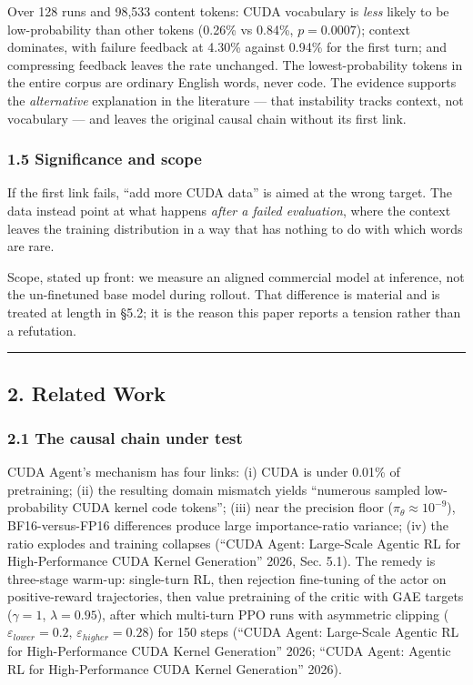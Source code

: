\documentclass[
  11pt,
]{article}
\begin{document}
Over 128 runs and 98,533 content tokens: CUDA vocabulary is \emph{less}
likely to be low-probability than other tokens (0.26\% vs 0.84\%,
\(p = 0.0007\)); context dominates, with failure feedback at 4.30\%
against 0.94\% for the first turn; and compressing feedback leaves the
rate unchanged. The lowest-probability tokens in the entire corpus are
ordinary English words, never code. The evidence supports the
\emph{alternative} explanation in the literature --- that instability
tracks context, not vocabulary --- and leaves the original causal chain
without its first link.

\hypertarget{significance-and-scope}{%
\subsubsection{1.5 Significance and
scope}\label{significance-and-scope}}

If the first link fails, ``add more CUDA data'' is aimed at the wrong
target. The data instead point at what happens \emph{after a failed
evaluation}, where the context leaves the training distribution in a way
that has nothing to do with which words are rare.

Scope, stated up front: we measure an aligned commercial model at
inference, not the un-finetuned base model during rollout. That
difference is material and is treated at length in §5.2; it is the
reason this paper reports a tension rather than a refutation.

\begin{center}\rule{0.5\linewidth}{0.5pt}\end{center}

\hypertarget{related-work}{%
\subsection{2. Related Work}\label{related-work}}

\hypertarget{the-causal-chain-under-test}{%
\subsubsection{2.1 The causal chain under
test}\label{the-causal-chain-under-test}}

CUDA Agent's mechanism has four links: (i) CUDA is under 0.01\% of
pretraining; (ii) the resulting domain mismatch yields ``numerous
sampled low-probability CUDA kernel code tokens''; (iii) near the
precision floor (\(\pi_\theta \approx 10^{-9}\)), BF16-versus-FP16
differences produce large importance-ratio variance; (iv) the ratio
explodes and training collapses ({``{CUDA Agent}: Large-Scale Agentic
{RL} for High-Performance {CUDA} Kernel Generation''} 2026, Sec. 5.1).
The remedy is three-stage warm-up: single-turn RL, then rejection
fine-tuning of the actor on positive-reward trajectories, then value
pretraining of the critic with GAE targets (\(\gamma = 1\),
\(\lambda = 0.95\)), after which multi-turn PPO runs with asymmetric
clipping (\(\varepsilon_{lower} = 0.2\),
\(\varepsilon_{higher} = 0.28\)) for 150 steps ({``{CUDA Agent}:
Large-Scale Agentic {RL} for High-Performance {CUDA} Kernel
Generation''} 2026; {``{CUDA Agent}: Agentic {RL} for High-Performance
{CUDA} Kernel Generation''} 2026).
\end{document}
